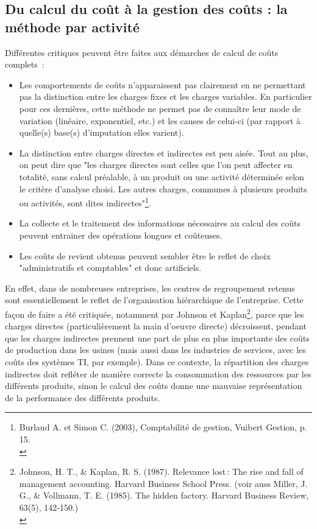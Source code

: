 \documentclass{kaobook}
\begin{document}
\subsection{Du calcul du coût à la gestion des coûts : la méthode par activité}
\label{sec:orgbc4bd4b}
Différentes critiques peuvent être faites aux démarches de calcul de coûts complets :\\
\begin{itemize}
\item Les comportements de coûts n'apparaissent pas clairement en ne permettant pas la distinction entre les charges fixes et les charges variables. En particulier pour ces dernières, cette méthode ne permet pas de connaître leur mode de variation (linéaire, exponentiel, etc.) et les causes de celui-ci (par rapport à quelle(s) base(s) d'imputation elles varient).\\
\item La distinction entre charges directes et indirectes est peu aisée. Tout au plus, on peut dire que "les charges directes sont celles que l'on peut affecter en totalité, sans calcul préalable, à un produit ou une activité déterminée selon le critère d'analyse choisi. Les autres charges, communes à plusieurs produits ou activités, sont dites indirectes"\footnote{Burlaud A. et Simon C. (2003), Comptabilité de gestion, Vuibert Gestion, p. 15.\\}.\\
\item La collecte et le traitement des informations nécessaires au calcul des coûts peuvent entrainer des opérations longues et coûteuses.\\
\item Les coûts de revient obtenus peuvent sembler être le reflet de choix "administratifs et comptables" et donc artificiels.\\
\end{itemize}

En effet, dans de nombreuses entreprises, les centres de regroupement retenus sont essentiellement le reflet de l'organisation hiérarchique de l'entreprise. Cette façon de faire a été critiquée, notamment par Johnson et Kaplan\footnote{Johnson, H. T., \& Kaplan, R. S. (1987). Relevance lost : The rise and fall of management accounting. Harvard Business School Press. (voir auss Miller, J. G., \& Vollmann, T. E. (1985). The hidden factory. Harvard Business Review, 63(5), 142‑150.)\\}, parce que les charges directes (particulièrement la main d'oeuvre directe) décroissent, pendant que les charges indirectes prennent une part de plus en plus importante des coûts de production dans les usines (mais aussi dans les industries de services, avec les coûts des systèmes TI, par exemple). Dans ce contexte, la répartition des charges indirectes doit refléter de manière correcte la consommation des ressources par les différents produits, sinon le calcul des coûts donne une mauvaise représentation de la performance des différents produits.\\
\end{document}
